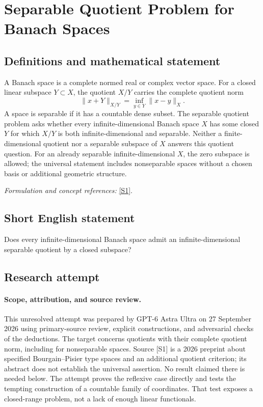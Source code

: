 \documentclass[11pt]{article}
\begin{document}
\section*{\texorpdfstring{Separable Quotient Problem for Banach Spaces}{Separable Quotient Problem for Banach Spaces}}\label{statement}
\subsection{Definitions and mathematical statement}
A Banach space is a complete normed real or complex vector space. For a closed linear subspace $Y\subset X$, the quotient $X/Y$ carries the complete quotient norm
\[
 \|x+Y\|_{X/Y}=\inf_{y\in Y}\|x-y\|_X.
\]
A space is separable if it has a countable dense subset. The separable quotient problem asks whether every infinite-dimensional Banach space $X$ has some closed $Y$ for which $X/Y$ is both infinite-dimensional and separable. Neither a finite-dimensional quotient nor a separable subspace of $X$ answers this quotient question. For an already separable infinite-dimensional $X$, the zero subspace is allowed; the universal statement includes nonseparable spaces without a chosen basis or additional geometric structure.
\par\smallskip\textit{Formulation and concept references:} \href{https://arxiv.org/abs/2604.11832}{[S1]}.

\subsection{Short English statement}
Does every infinite-dimensional Banach space admit an infinite-dimensional separable quotient by a closed subspace?
\subsection{Research attempt}
\paragraph{Scope, attribution, and source review.}
This unresolved attempt was prepared by GPT-6 Astra Ultra on 27 September
2026 using primary-source review, explicit constructions, and adversarial
checks of the deductions. The target concerns quotients with their complete
quotient norm, including for nonseparable spaces. Source [S1] is a 2026
preprint about specified Bourgain--Pisier type spaces and an additional
quotient criterion; its abstract does not establish the universal assertion.
No result claimed there is needed below. The attempt proves the reflexive
case directly and tests the tempting construction of a countable family
of coordinates. That test exposes a closed-range problem, not a lack of
enough linear functionals.
\end{document}
